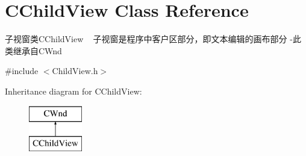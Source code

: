 \hypertarget{class_c_child_view}{}\section{C\+Child\+View Class Reference}
\label{class_c_child_view}


子视窗类\+C\+Child\+View ~\newline
子视窗是程序中客户区部分，即文本编辑的画布部分 -\/此类继承自\+C\+Wnd  




{\ttfamily \#include $<$Child\+View.\+h$>$}

Inheritance diagram for C\+Child\+View\+:\begin{figure}[H]
\begin{center}
\leavevmode
\includegraphics[height=2.000000cm]{class_c_child_view}
\end{center}
\end{figure}
